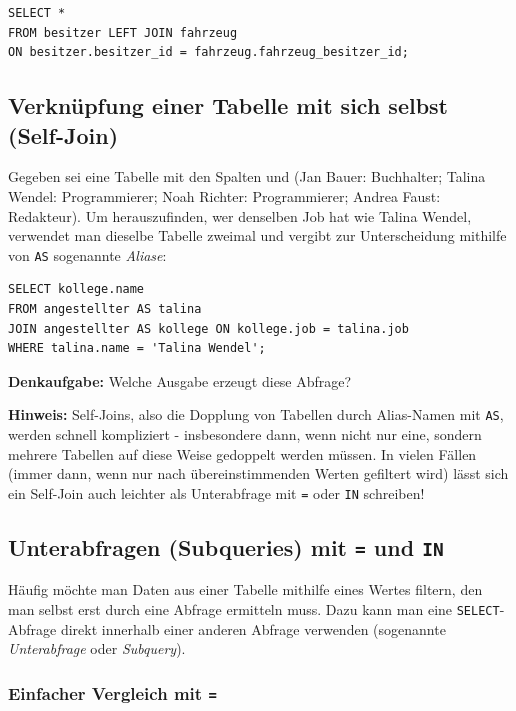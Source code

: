 \begin{lstlisting}
SELECT *
FROM besitzer LEFT JOIN fahrzeug
ON besitzer.besitzer_id = fahrzeug.fahrzeug_besitzer_id;
\end{lstlisting}

\subsection{Verknüpfung einer Tabelle mit sich selbst (Self-Join)}

Gegeben sei eine Tabelle  mit den Spalten
 und  (Jan Bauer: Buchhalter; Talina Wendel:
Programmierer; Noah Richter: Programmierer; Andrea Faust: Redakteur). Um
herauszufinden, wer denselben Job hat wie Talina Wendel, verwendet man dieselbe
Tabelle zweimal und vergibt zur Unterscheidung mithilfe von \lstinline|AS|
sogenannte \emph{Aliase}:

\begin{lstlisting}
SELECT kollege.name
FROM angestellter AS talina
JOIN angestellter AS kollege ON kollege.job = talina.job
WHERE talina.name = 'Talina Wendel';
\end{lstlisting}

\noindent \textbf{Denkaufgabe:} Welche Ausgabe erzeugt diese Abfrage?

\textbf{Hinweis:} Self-Joins, also die Dopplung von Tabellen durch Alias-Namen mit 
\lstinline|AS|, werden schnell kompliziert - insbesondere dann, wenn nicht nur eine, 
sondern mehrere Tabellen auf diese Weise gedoppelt werden müssen. In vielen Fällen 
(immer dann, wenn nur nach übereinstimmenden Werten gefiltert wird) lässt sich ein 
Self-Join auch leichter als Unterabfrage mit \lstinline|=| oder \lstinline|IN| 
schreiben!

\subsection{Unterabfragen (Subqueries) mit \texttt{=} und \texttt{IN}}

Häufig möchte man Daten aus einer Tabelle mithilfe eines Wertes filtern, den man
selbst erst durch eine Abfrage ermitteln muss. Dazu kann man eine
\lstinline|SELECT|-Abfrage direkt innerhalb einer anderen Abfrage verwenden
(sogenannte \emph{Unterabfrage} oder \emph{Subquery}).

\subsubsection{Einfacher Vergleich mit \texttt{=}}

